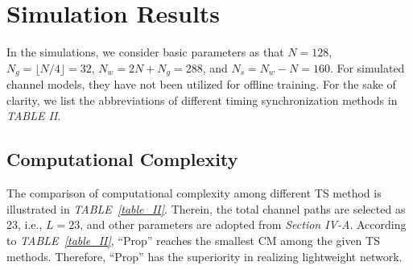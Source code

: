 \documentclass[conference]{IEEEtran}
\begin{document}
\section{Simulation Results}\label{S:IV}
In the simulations, we consider basic parameters as that $N=128$, $N_g=\lfloor N/4\rfloor=32$\cite{ref:ELM-FTS}, $N_w=2N+N_g=288$, and $N_s=N_w-N=160$.
For simulated channel models, they have not been utilized for offline training.
For the sake of clarity, we list the abbreviations of different timing synchronization methods in \emph{TABLE II}.
\begin{table}
\vspace{-4mm}
\renewcommand{\arraystretch}{1.5}
\caption{Computational Complexity among Different TS Methods}
\label{table_II}
\centering
\scriptsize
{}
\vspace{-3mm}
\end{table}
\vspace{-4mm}
\subsection{Computational Complexity}\label{VB}
The comparison of computational complexity among different TS method is illustrated in \emph{TABLE~\ref{table_II}}. Therein, the total channel paths are selected as 23, i.e., $L=23$, and other parameters are adopted from \emph{Section IV-A}.
According to \emph{TABLE~\ref{table_II}}, ``Prop'' reaches the smallest CM  among the given TS methods.
Therefore, ``Prop'' has the superiority in realizing lightweight network.\vspace{-2mm}
\end{document}
